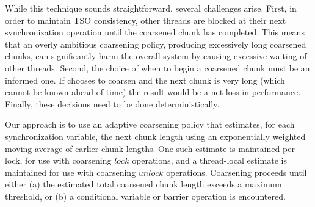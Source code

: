 

While this technique sounds straightforward, several challenges arise. First, in order to maintain TSO consistency, other threads are blocked at their next synchronization operation until the coarsened chunk has completed. This means that an overly ambitious coarsening policy, producing excessively long coarsened chunks, can significantly harm the overall system by causing excessive waiting of other threads. Second, the choice of when to begin a coarsened chunk must be an informed one. If \lib{} chooses to coarsen and the next chunk is very long (which cannot be known ahead of time) the result would be a net loss in performance. Finally, these decisions need to be done deterministically.

Our approach is to use an adaptive coarsening policy that estimates, for each synchronization variable, the next chunk length using an exponentially weighted moving average of earlier chunk lengths. One such estimate is maintained per lock, for use with coarsening $lock$ operations, and a thread-local estimate is maintained for use with coarsening $unlock$ operations.  
Coarsening proceeds until either (a) the estimated total coarsened chunk length exceeds a maximum threshold, or (b) a conditional variable or barrier operation is encountered. 

